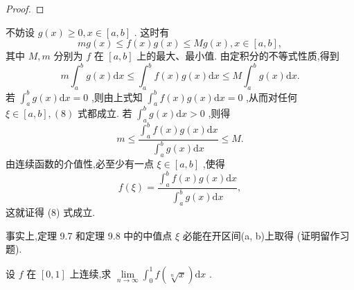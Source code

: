 \begin{proof}

\end{proof}
不妨设 \(g\left( x\right)  \geq  0,x \in  \left\lbrack  {a,b}\right\rbrack\) . 这时有
\[
{mg}\left( x\right)  \leq  f\left( x\right) g\left( x\right)  \leq  {Mg}\left( x\right) ,x \in  \left\lbrack  {a,b}\right\rbrack  ,
\]
其中 \(M,m\) 分别为 \(f\) 在 \(\left\lbrack  {a,b}\right\rbrack\) 上的最大、最小值. 由定积分的不等式性质,得到
\[
m{\int }_{a}^{b}g\left( x\right) \mathrm{d}x \leq  {\int }_{a}^{b}f\left( x\right) g\left( x\right) \mathrm{d}x \leq  M{\int }_{a}^{b}g\left( x\right) \mathrm{d}x.
\]
若 \({\int }_{a}^{b}g\left( x\right) \mathrm{d}x = 0\) ,则由上式知 \({\int }_{a}^{b}f\left( x\right) g\left( x\right) \mathrm{d}x = 0\) ,从而对任何 \(\xi  \in  \left\lbrack  {a,b}\right\rbrack  ,\left( 8\right)\) 式都成立. 若 \({\int }_{a}^{b}g\left( x\right) \mathrm{d}x > 0\) ,则得
\[
m \leq  \frac{{\int }_{a}^{b}f\left( x\right) g\left( x\right) \mathrm{d}x}{{\int }_{a}^{b}g\left( x\right) \mathrm{d}x} \leq  M.
\]
由连续函数的介值性,必至少有一点 \(\xi  \in  \left\lbrack  {a,b}\right\rbrack\) ,使得
\[
f\left( \xi \right)  = \frac{{\int }_{a}^{b}f\left( x\right) g\left( x\right) \mathrm{d}x}{{\int }_{a}^{b}g\left( x\right) \mathrm{d}x},
\]
这就证得 (8) 式成立.

\begin{remark}

\end{remark}
事实上,定理 9.7 和定理 9.8 中的中值点 \(\xi\) 必能在开区间(a, b)上取得 (证明留作习题).

\begin{example}

\end{example}
设 \(f\) 在 \(\left\lbrack  {0,1}\right\rbrack\) 上连续,求 \(\mathop{\lim }\limits_{{n \rightarrow  \infty }}{\int }_{0}^{1}f\left( \sqrt[n]{x}\right) \mathrm{d}x\) .

